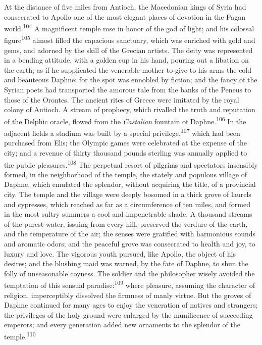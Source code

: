 At the distance of five miles from Antioch, the Macedonian kings
of Syria had consecrated to Apollo one of the most elegant places
of devotion in the Pagan world.\textsuperscript{104} A magnificent temple rose in
honor of the god of light; and his colossal figure\textsuperscript{105} almost
filled the capacious sanctuary, which was enriched with gold and
gems, and adorned by the skill of the Grecian artists. The deity
was represented in a bending attitude, with a golden cup in his
hand, pouring out a libation on the earth; as if he supplicated
the venerable mother to give to his arms the cold and beauteous
Daphne: for the spot was ennobled by fiction; and the fancy of
the Syrian poets had transported the amorous tale from the banks
of the Peneus to those of the Orontes. The ancient rites of
Greece were imitated by the royal colony of Antioch. A stream of
prophecy, which rivalled the truth and reputation of the Delphic
oracle, flowed from the \textit{Castalian} fountain of Daphne.\textsuperscript{106} In
the adjacent fields a stadium was built by a special privilege,\textsuperscript{107}
which had been purchased from Elis; the Olympic games were
celebrated at the expense of the city; and a revenue of thirty
thousand pounds sterling was annually applied to the public
pleasures.\textsuperscript{108} The perpetual resort of pilgrims and spectators
insensibly formed, in the neighborhood of the temple, the stately
and populous village of Daphne, which emulated the splendor,
without acquiring the title, of a provincial city. The temple and
the village were deeply bosomed in a thick grove of laurels and
cypresses, which reached as far as a circumference of ten miles,
and formed in the most sultry summers a cool and impenetrable
shade. A thousand streams of the purest water, issuing from every
hill, preserved the verdure of the earth, and the temperature of
the air; the senses were gratified with harmonious sounds and
aromatic odors; and the peaceful grove was consecrated to health
and joy, to luxury and love. The vigorous youth pursued, like
Apollo, the object of his desires; and the blushing maid was
warned, by the fate of Daphne, to shun the folly of unseasonable
coyness. The soldier and the philosopher wisely avoided the
temptation of this sensual paradise:\textsuperscript{109} where pleasure, assuming
the character of religion, imperceptibly dissolved the firmness
of manly virtue. But the groves of Daphne continued for many ages
to enjoy the veneration of natives and strangers; the privileges
of the holy ground were enlarged by the munificence of succeeding
emperors; and every generation added new ornaments to the
splendor of the temple.\textsuperscript{110}


